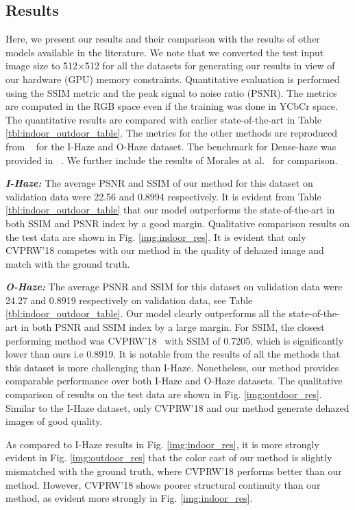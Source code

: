 \documentclass[runningheads]{llncs}
\begin{document}
\subsection{Results} 
Here, we present our results and their comparison with the results of other models available in the literature. We note that we converted the test input image size to 512$\times$512 for all the datasets for generating our results in view of our hardware (GPU) memory constraints. Quantitative evaluation is performed using the SSIM metric and the peak signal to noise ratio (PSNR). The metrics are computed in the RGB space even if the training was done in YCbCr space. The quantitative  results are compared with earlier state-of-the-art in Table \ref{tbl:indoor_outdoor_table}. The metrics for the other methods are reproduced from ~\cite{zhang2018multi} for the I-Haze and O-Haze dataset. The benchmark for Dense-haze was provided in ~\cite{ancuti2019dense}. We further include the results of Morales at al.~\cite{morales2019feature} for comparison.

\textbf{\textit{I-Haze:}} The average PSNR and SSIM of our method for this dataset on validation data were 22.56 and 0.8994 respectively. It is evident from  Table \ref{tbl:indoor_outdoor_table} that our model outperforms the state-of-the-art in both SSIM and PSNR index by a good margin. Qualitative comparison results on the test data are shown in Fig. \ref{img:indoor_res}. It is evident that only CVPRW'18 \cite{zhang2018multi} competes with our method in the quality of dehazed image and match with the ground truth. 

\textbf{\textit{O-Haze:}} The average PSNR and SSIM for this dataset on validation data were 24.27 and 0.8919 respectively on validation data, see Table \ref{tbl:indoor_outdoor_table}. Our model clearly outperforms all the state-of-the-art in both PSNR and SSIM index by a large margin. For SSIM, the closest performing method was CVPRW'18~\cite{zhang2018multi} with SSIM of 0.7205, which is significantly lower than ours i.e 0.8919. It is notable from the results of all the methods that this dataset is more challenging than I-Haze. Nonetheless, our method provides comparable performance over both I-Haze and O-Haze datasets. The qualitative comparison of results on the test data are shown in Fig. \ref{img:outdoor_res}. Similar to the I-Haze dataset, only CVPRW'18 \cite{zhang2018multi} and our method generate dehazed images of good quality. 

As compared to I-Haze results in Fig. \ref{img:indoor_res}, it is more strongly evident in Fig. \ref{img:outdoor_res} that the color cast of our method is slightly mismatched with the ground truth, where CVPRW'18 performs better than our method. However, CVPRW'18 shows poorer structural continuity than our method, as evident more strongly in Fig. \ref{img:indoor_res}.  
\end{document}
